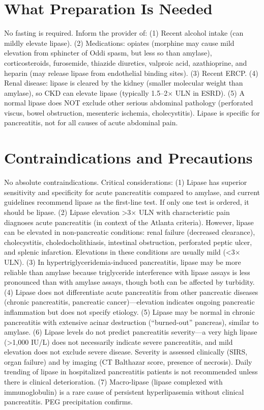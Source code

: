 \section*{What Preparation Is Needed}
No fasting is required. Inform the provider of: (1) Recent alcohol intake (can mildly elevate lipase). (2) Medications: opiates (morphine may cause mild elevation from sphincter of Oddi spasm, but less so than amylase), corticosteroids, furosemide, thiazide diuretics, valproic acid, azathioprine, and heparin (may release lipase from endothelial binding sites). (3) Recent ERCP. (4) Renal disease: lipase is cleared by the kidney (smaller molecular weight than amylase), so CKD can elevate lipase (typically 1.5--2$\times$ ULN in ESRD). (5) A normal lipase does NOT exclude other serious abdominal pathology (perforated viscus, bowel obstruction, mesenteric ischemia, cholecystitis). Lipase is specific for pancreatitis, not for all causes of acute abdominal pain.

\section*{Contraindications and Precautions}
No absolute contraindications. Critical considerations: (1) Lipase has superior sensitivity and specificity for acute pancreatitis compared to amylase, and current guidelines recommend lipase as the first-line test. If only one test is ordered, it should be lipase. (2) Lipase elevation >3$\times$ ULN with characteristic pain diagnoses acute pancreatitis (in context of the Atlanta criteria). However, lipase can be elevated in non-pancreatic conditions: renal failure (decreased clearance), cholecystitis, choledocholithiasis, intestinal obstruction, perforated peptic ulcer, and splenic infarction. Elevations in these conditions are usually mild (<3$\times$ ULN). (3) In hypertriglyceridemia-induced pancreatitis, lipase may be more reliable than amylase because triglyceride interference with lipase assays is less pronounced than with amylase assays, though both can be affected by turbidity. (4) Lipase does not differentiate acute pancreatitis from other pancreatic diseases (chronic pancreatitis, pancreatic cancer)---elevation indicates ongoing pancreatic inflammation but does not specify etiology. (5) Lipase may be normal in chronic pancreatitis with extensive acinar destruction (``burned-out'' pancreas), similar to amylase. (6) Lipase levels do not predict pancreatitis severity---a very high lipase (>1,000 IU/L) does not necessarily indicate severe pancreatitis, and mild elevation does not exclude severe disease. Severity is assessed clinically (SIRS, organ failure) and by imaging (CT Balthazar score, presence of necrosis). Daily trending of lipase in hospitalized pancreatitis patients is not recommended unless there is clinical deterioration. (7) Macro-lipase (lipase complexed with immunoglobulin) is a rare cause of persistent hyperlipasemia without clinical pancreatitis. PEG precipitation confirms.

